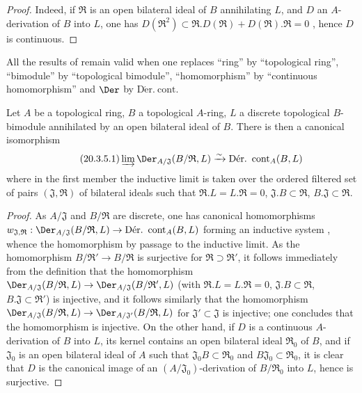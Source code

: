\begin{proof}
Indeed, if $\mathfrak{R}$ is an open bilateral ideal of $B$ annihilating $L$, and $D$ an $A$-derivation of $B$ into $L$, one has $D(\mathfrak{R}^2)\subset\mathfrak{R}.D(\mathfrak{R})+D(\mathfrak{R}).\mathfrak{R}=0$ , hence $D$ is continuous.
\end{proof}

\begin{env}[20.3.4]
\label{0.20.3.4}
All the results of  remain valid when one replaces ``ring'' by ``topological ring'', ``bimodule'' by ``topological bimodule'', ``homomorphism'' by ``continuous homomorphism'' and $\Der$ by $\operatorname{D\acute{e}r.\ cont}$.
\end{env}

\begin{proposition}[20.3.5]
\label{0.20.3.5}
Let $A$ be a topological ring, $B$ a topological $A$-ring, $L$ a discrete topological $B$-bimodule annihilated by an open bilateral ideal of $B$.
There is then a canonical isomorphism
\begin{equation}
\tag{20.3.5.1}
  \label{0.20.3.5.1}
  \varinjlim\Der_{A/\mathfrak{J}}(B/\mathfrak{R},L)\xrightarrow{\sim}\operatorname{D\acute{e}r.\ cont}_A(B,L)
\end{equation}
where in the first member the inductive limit is taken over the ordered filtered set of pairs $(\mathfrak{J},\mathfrak{R})$ of bilateral ideals such that $\mathfrak{R}.L=L.\mathfrak{R}=0$, $\mathfrak{J}.B\subset\mathfrak{R}$, $B.\mathfrak{J}\subset\mathfrak{R}$.
\end{proposition}

\begin{proof}
As $A/\mathfrak{J}$ and $B/\mathfrak{R}$ are discrete, one has canonical homomorphisms $w_{\mathfrak{J},\mathfrak{R}}:\Der_{A/\mathfrak{J}}(B/\mathfrak{R},L)\to\operatorname{D\acute{e}r.\ cont}_A(B,L)$ forming an inductive system , whence the homomorphism  by passage to the inductive limit.
As the homomorphism $B/\mathfrak{R}'\to B/\mathfrak{R}$ is surjective for $\mathfrak{R}\supset\mathfrak{R}'$, it follows immediately from the definition that the homomorphism $\Der_{A/\mathfrak{J}}(B/\mathfrak{R},L)\to\Der_{A/\mathfrak{J}}(B/\mathfrak{R}',L)$ (with $\mathfrak{R}.L=L.\mathfrak{R}=0$, $\mathfrak{J}.B\subset\mathfrak{R}$, $B.\mathfrak{J}\subset\mathfrak{R}'$) is injective, and it follows similarly that the homomorphism $\Der_{A/\mathfrak{J}}(B/\mathfrak{R},L)\to\Der_{A/\mathfrak{J}'}(B/\mathfrak{R},L)$ for $\mathfrak{J}'\subset\mathfrak{J}$  is injective; one concludes that the homomorphism  is injective.
On the other hand, if $D$ is a continuous $A$-derivation of $B$ into $L$, its kernel contains an open bilateral ideal $\mathfrak{R}_0$ of $B$, and if $\mathfrak{J}_0$ is an open bilateral ideal of $A$ such that $\mathfrak{J}_0 B\subset\mathfrak{R}_0$ and $B\mathfrak{J}_0\subset\mathfrak{R}_0$, it is clear that $D$ is the canonical image of an $(A/\mathfrak{J}_0)$-derivation of $B/\mathfrak{R}_0$ into $L$, hence  is surjective.
\end{proof}

